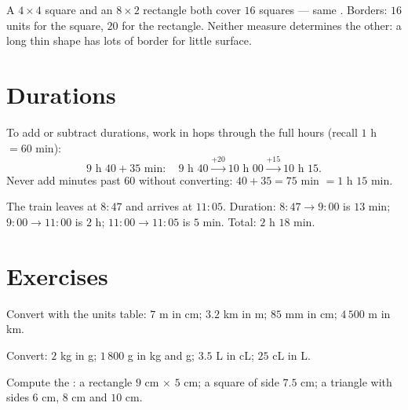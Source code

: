 \begin{example}\label{ex:g4:measure:samearea}
A $4 \times 4$ square and an $8 \times 2$ rectangle both cover $16$
squares --- same . Borders: $16$ units for the square, $20$ for
the rectangle. Neither measure determines the other: a long thin
shape has lots of border for little surface.
\end{example}

\section{Durations}

\begin{method}\label{met:g4:measure:time}
To add or subtract durations, work in hops through the full hours
(recall $1$ h $= 60$ min):
\[
9\text{ h }40 + 35 \text{ min}:
\quad 9\text{ h }40 \xrightarrow{+20} 10\text{ h }00
\xrightarrow{+15} 10\text{ h }15 .
\]
Never add minutes past $60$ without converting: $40 + 35 = 75$ min
$= 1$ h $15$ min.
\end{method}

\begin{example}\label{ex:g4:measure:timetable}
The train leaves at $8{:}47$ and arrives at $11{:}05$. Duration:
$8{:}47 \to 9{:}00$ is $13$ min; $9{:}00 \to 11{:}00$ is $2$ h;
$11{:}00 \to 11{:}05$ is $5$ min. Total: $2$ h $18$ min.
\end{example}

\section{Exercises}

\begin{exercise}[$\star$]\label{exo:g4:measure:1}
Convert with the units table: $7$ m in cm; $3.2$ km in m; $85$ mm in
cm; $4\,500$ m in km.
\end{exercise}

\begin{exercise}[$\star$]\label{exo:g4:measure:2}
Convert: $2$ kg in g; $1\,800$ g in kg and g; $3.5$ L in cL;
$25$ cL in L.
\end{exercise}

\begin{exercise}[$\star$]\label{exo:g4:measure:3}
Compute the : a rectangle $9$ cm $\times$ $5$ cm; a square
of side $7.5$ cm; a triangle with sides $6$ cm, $8$ cm and $10$ cm.
\end{exercise}

